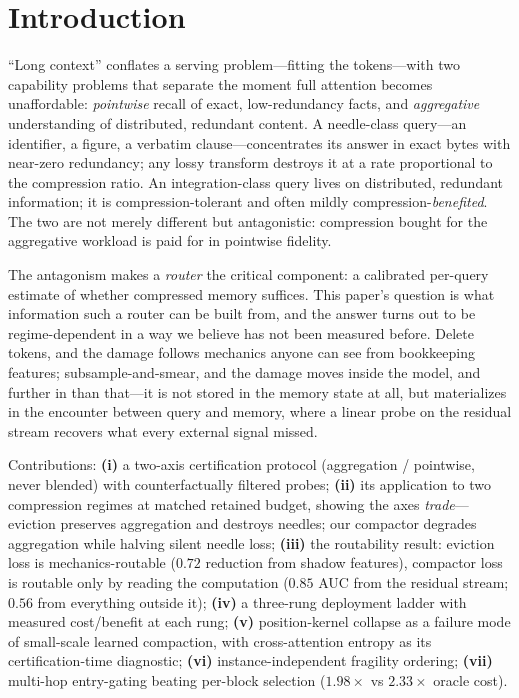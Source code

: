 \documentclass[11pt]{article}
\begin{document}
\section{Introduction}

``Long context'' conflates a serving problem---fitting the tokens---with two
capability problems that separate the moment full attention becomes
unaffordable: \emph{pointwise} recall of exact, low-redundancy facts, and
\emph{aggregative} understanding of distributed, redundant content. A
needle-class query---an identifier, a figure, a verbatim clause---concentrates
its answer in exact bytes with near-zero redundancy; any lossy transform
destroys it at a rate proportional to the compression ratio. An
integration-class query lives on distributed, redundant information; it is
compression-tolerant and often mildly compression-\emph{benefited}. The two
are not merely different but antagonistic: compression bought for the
aggregative workload is paid for in pointwise fidelity.

The antagonism makes a \emph{router} the critical component: a calibrated
per-query estimate of whether compressed memory suffices. This paper's
question is what information such a router can be built from, and the answer
turns out to be regime-dependent in a way we believe has not been measured
before. Delete tokens, and the damage follows mechanics anyone can see from
bookkeeping features; subsample-and-smear, and the damage moves inside the
model, and further in than that---it is not stored in the memory state at
all, but materializes in the encounter between query and memory, where a
linear probe on the residual stream recovers what every external signal
missed.

Contributions: \textbf{(i)} a two-axis certification protocol (aggregation /
pointwise, never blended) with counterfactually filtered probes;
\textbf{(ii)} its application to two compression regimes at matched retained
budget, showing the axes \emph{trade}---eviction preserves aggregation and
destroys needles; our compactor degrades aggregation while halving silent
needle loss; \textbf{(iii)} the routability result: eviction loss is
mechanics-routable ($0.72$ reduction from shadow features), compactor loss
is routable only by reading the computation ($0.85$ AUC from the residual
stream; $0.56$ from everything outside it); \textbf{(iv)} a three-rung
deployment ladder with measured cost/benefit at each rung; \textbf{(v)}
position-kernel collapse as a failure mode of small-scale learned
compaction, with cross-attention entropy as its certification-time
diagnostic; \textbf{(vi)} instance-independent fragility ordering;
\textbf{(vii)} multi-hop entry-gating beating per-block selection
($1.98\times$ vs $2.33\times$ oracle cost).
\end{document}
